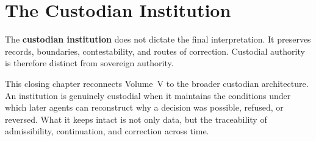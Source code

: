 
\chapter{The Custodian Institution}
\label{ch:ch058}

The \textbf{custodian institution} does not dictate the final interpretation. It preserves records, boundaries, contestability, and routes of correction. Custodial authority is therefore distinct from sovereign authority.

This closing chapter reconnects Volume~V to the broader custodian architecture. An institution is genuinely custodial when it maintains the conditions under which later agents can reconstruct why a decision was possible, refused, or reversed. What it keeps intact is not only data, but the traceability of admissibility, continuation, and correction across time.
